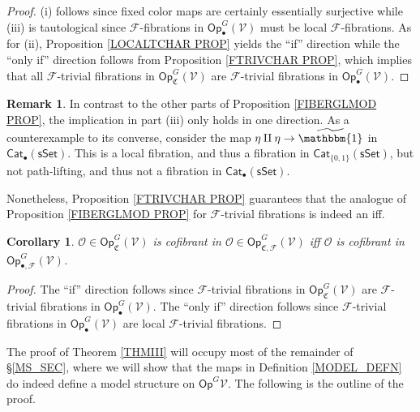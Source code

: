 \documentclass[a4paper,10pt
,draft
]{article}%
\numberwithin{equation}{section}
\numberwithin{figure}{section}
\newtheorem{corollary}[equation]{Corollary}%
\theoremstyle{definition} %
\newtheorem{remark}[equation]{Remark}%
\newcommand{\Op}{\mathsf{Op}}%
\newcommand{\F}{\ensuremath{\mathcal F}}
\newcommand{\V}{\ensuremath{\mathcal V}}
\renewcommand{\O}{\ensuremath{\mathcal O}}
\newcommand{\1}{\ensuremath{\mathbbm 1}}%
\begin{document}
\begin{proof}
	(i) follows since fixed color maps are certainly essentially surjective while (iii) is tautological since 
	$\F$-fibrations in $\mathsf{Op}_{\bullet}^G(\V)$ must be local $\F$-fibrations.
	As for (ii), 
	Proposition \ref{LOCALTCHAR PROP} yields the ``if'' direction
	while the ``only if'' direction follows from 
	Proposition \ref{FTRIVCHAR PROP}, 
	which implies that all $\F$-trivial fibrations in $\mathsf{Op}_{\mathfrak{C}}^G(\V)$
	are $\F$-trivial fibrations in 
	$\mathsf{Op}_{\bullet}^G(\V)$.
\end{proof}


\begin{remark}
In contrast to the other parts of 
Proposition \ref{FIBERGLMOD PROP},
the implication in part (iii) 
only holds in one direction. 
As a counterexample to its converse, 
consider the map $\eta \amalg \eta \to \widetilde{\mathbbm{1}}$
in $\mathsf{Cat}_{\bullet}(\mathsf{sSet})$. This is a local fibration, 
and thus a fibration in $\mathsf{Cat}_{\{0,1\}}(\mathsf{sSet})$,
but not path-lifting, and thus not a fibration in $\mathsf{Cat}_{\bullet}(\mathsf{sSet})$.

Nonetheless, Proposition \ref{FTRIVCHAR PROP}
guarantees that the analogue of Proposition \ref{FIBERGLMOD PROP}
for $\F$-trivial fibrations is indeed an iff.
\end{remark}



\begin{corollary}
      $\O \in \Op^G_{\mathfrak C}(\V)$ is cofibrant in
      $\O \in \Op^G_{\mathfrak C,\mathcal{F}}(\V)$
      iff $\O$ is cofibrant in $\Op^G_{\bullet,\F}(\V)$.
\end{corollary}

\begin{proof}
	The ``if'' direction follows since
	$\F$-trivial fibrations in $ \Op^G_{\mathfrak C}(\V)$
	are
	$\F$-trivial fibrations in $ \Op^G_{\bullet}(\V)$.
	The ``only if'' direction follows since
	$\F$-trivial fibrations in $ \Op^G_{\bullet}(\V)$
	are local $\F$-trivial fibrations.
\end{proof}


The proof of Theorem \ref{THMIII} will occupy most of 
the remainder of \S \ref{MS_SEC},
where we will show that the maps in Definition \ref{MODEL_DEFN}
do indeed define a model structure on $\mathsf{Op}^G{\V}$.
The following is the outline of the proof.
\end{document}

